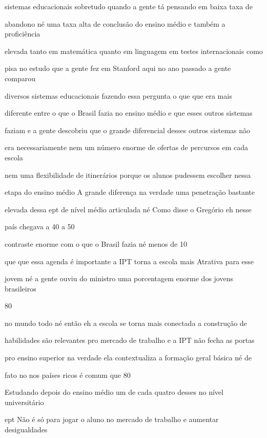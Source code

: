 \documentclass[a4paper,12pt]{article}
\begin{document}
sistemas educacionais sobretudo quando a gente tá pensando em baixa taxa de

abandono né uma taxa alta de conclusão do ensino médio e também a proficiência

elevada tanto em matemática quanto em linguagem em testes internacionais como

pisa no estudo que a gente fez em Stanford aqui no ano passado a gente comparou

diversos sistemas educacionais fazendo essa pergunta o que que era mais

diferente entre o que o Brasil fazia no ensino médio e que esses outros sistemas

faziam e a gente descobriu que o grande diferencial desses outros sistemas não

era necessariamente nem um número enorme de ofertas de percursos em cada escola

nem uma flexibilidade de itinerários porque os alunos pudessem escolher nessa

etapa do ensino médio A grande diferença na verdade uma penetração bastante

elevada dessa ept de nível médio articulada né Como disse o Gregório eh nesse

país chegava a 40 a 50%

contraste enorme com o que o Brasil fazia né menos de 10%

que que essa agenda é importante a IPT torna a escola mais Atrativa para esse

jovem né a gente ouviu do ministro uma porcentagem enorme dos jovens brasileiros

80%

no mundo todo né então eh a escola se torna mais conectada a construção de

habilidades são relevantes pro mercado de trabalho e a IPT não fecha as portas

pro ensino superior na verdade ela contextualiza a formação geral básica né de

fato no nos países ricos é comum que 80%

Estudando depois do ensino médio um de cada quatro desses no nível universitário

ept Não é só para jogar o aluno no mercado de trabalho e aumentar desigualdades
\end{document}
